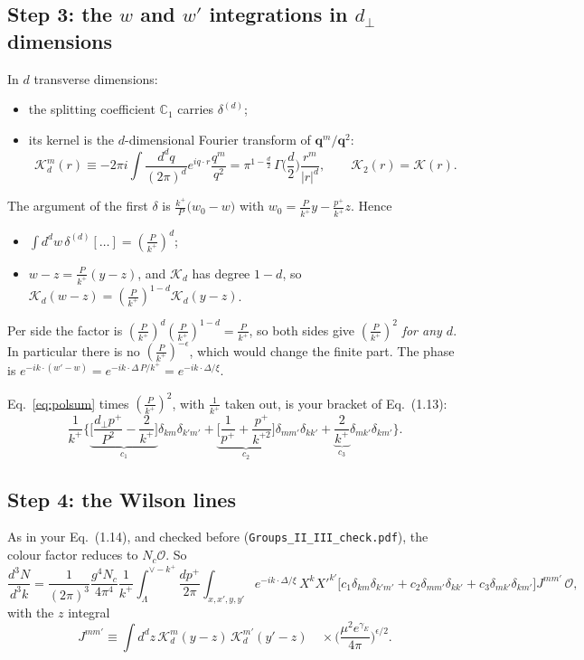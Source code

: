 \documentclass[10pt]{article}
\numberwithin{equation}{section}
\def\mf#1{\mathbb{#1}}
\newcommand{\KK}{\mathcal K}
\newcommand{\OO}{\mathcal O}
\begin{document}
\subsection{Step 3: the \texorpdfstring{$w$}{w} and \texorpdfstring{$w'$}{w'} integrations in \texorpdfstring{$d_\perp$}{d} dimensions}
In $d$ transverse dimensions:
\begin{itemize}
\item the splitting coefficient $\mf C_1$ carries $\delta^{(d)}$;
\item its kernel is the $d$-dimensional Fourier transform of $\mathbf q^m/\mathbf q^2$:
\begin{equation}
\KK^m_d(r)\equiv-2\pi i\int\frac{d^dq}{(2\pi)^d}e^{iq\cdot r}\frac{q^m}{q^2}=\pi^{1-\frac d2}\,\Gamma\Big(\frac d2\Big)\frac{r^m}{|r|^d},\qquad \KK_2(r)=\KK(r).
\label{eq:Kd}
\end{equation}
\end{itemize}
The argument of the first $\delta$ is $\frac{k^+}{P}\big(w_0-w\big)$ with $w_0=\frac{P}{k^+}y-\frac{p^+}{k^+}z$. Hence
\begin{itemize}
\item $\int d^dw\,\delta^{(d)}[\dots]=(\frac{P}{k^+})^d$;
\item $w-z=\frac{P}{k^+}(y-z)$, and $\KK_d$ has degree $1-d$, so $\KK_d(w-z)=(\frac{P}{k^+})^{1-d}\KK_d(y-z)$.
\end{itemize}
Per side the factor is $(\frac{P}{k^+})^d(\frac{P}{k^+})^{1-d}=\frac{P}{k^+}$, so both sides give $(\frac{P}{k^+})^2$ \emph{for any $d$}. In particular there is no $(\frac{P}{k^+})^{-\epsilon}$, which would change the finite part. The phase is $e^{-ik\cdot(w'-w)}=e^{-ik\cdot\Delta\,P/k^+}=e^{-ik\cdot\Delta/\xi}$.

Eq.~\eqref{eq:polsum} times $(\frac{P}{k^+})^2$, with $\frac1{k^+}$ taken out, is your bracket of Eq.~(1.13):
\begin{equation}
\frac{1}{k^+}\Big\{\underbrace{\Big[\frac{d_\perp p^+}{P^2}-\frac{2}{k^+}\Big]}_{c_1}\delta_{km}\delta_{k'm'}+\underbrace{\Big[\frac{1}{p^+}+\frac{p^+}{k^{+2}}\Big]}_{c_2}\delta_{mm'}\delta_{kk'}+\underbrace{\frac{2}{k^+}}_{c_3}\delta_{mk'}\delta_{km'}\Big\}.
\label{eq:bracket}
\end{equation}

\subsection{Step 4: the Wilson lines}
As in your Eq.~(1.14), and checked before (\texttt{Groups\_II\_III\_check.pdf}), the colour factor reduces to $N_c\OO$. So
\begin{equation}
\frac{d^3N}{d^3k}=\frac{1}{(2\pi)^3}\frac{g^4N_c}{4\pi^4}\frac{1}{k^+}\int_\Lambda^{\vee-k^+}\frac{dp^+}{2\pi}\int_{x,x',y,y'}e^{-ik\cdot\Delta/\xi}\,X^kX'^{k'}\big[c_1\delta_{km}\delta_{k'm'}+c_2\delta_{mm'}\delta_{kk'}+c_3\delta_{mk'}\delta_{km'}\big]J^{mm'}\,\OO ,
\label{eq:beforez}
\end{equation}
with the $z$ integral
\begin{equation}
J^{mm'}\equiv\int d^dz\,\KK^m_d(y-z)\,\KK^{m'}_d(y'-z)\quad\times\Big(\frac{\mu^2e^{\gamma_E}}{4\pi}\Big)^{\epsilon/2}.
\end{equation}
\end{document}
